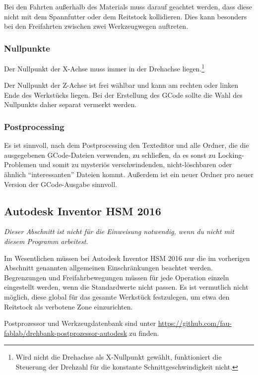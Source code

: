 \documentclass{\basedir/fablab-document}
\begin{document}
Bei den Fahrten außerhalb des Materials muss darauf geachtet werden, dass diese nicht mit dem Spannfutter oder dem Reitstock kollidieren. Dies kann besonders bei den Freifahrten zwischen zwei Werkzeugwegen auftreten.

\subsubsection{Nullpunkte} \label{sec:cnc-erstellung.allg.nullpunkte}
Der Nullpunkt der X-Achse muss immer in der Drehachse liegen.\footnote{Wird nicht die Drehachse als X-Nullpunkt gewählt, funktioniert die Steuerung der Drehzahl für die konstante Schnittgeschwindigkeit nicht.}

Der Nullpunkt der Z-Achse ist frei wählbar und kann am rechten oder linken Ende des Werkstücks liegen. Bei der Erstellung des GCode sollte die Wahl des Nullpunkts daher separat vermerkt werden.

\subsubsection{Postprocessing}
Es ist sinnvoll, nach dem Postprocessing den Texteditor und alle Ordner, die die ausgegebenen
GCode-Dateien verwenden, zu schließen, da es sonst zu Locking-Problemen und
somit zu mysteriös verschwindenden, nicht-löschbaren oder ähnlich
"`interessanten"' Dateien kommt. Außerdem ist ein neuer Ordner pro neuer
Version der GCode-Ausgabe sinnvoll.

\subsection{Autodesk Inventor HSM 2016}
\emph{Dieser Abschnitt ist nicht für die Einweisung notwendig, wenn du nicht mit diesem Programm arbeitest.}

Im Wesentlichen müssen bei Autodesk Inventor HSM 2016 nur die im vorherigen Abschnitt genannten allgemeinen Einschränkungen beachtet werden.
Begrenzungen und Freifahrbewegungen müssen für jede Operation einzeln eingestellt werden, wenn die Standardwerte nicht passen. Es ist vermutlich nicht möglich, diese global für das gesamte Werkstück festzulegen, um etwa den Reitstock als verbotene Zone einzurichten.

Postprozessor und Werkzeugdatenbank sind unter \url{https://github.com/fau-fablab/drehbank-postprozessor-autodesk} zu finden.
\end{document}
